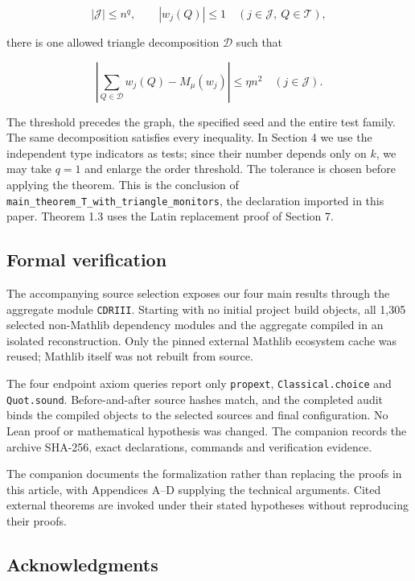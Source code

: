 \documentclass[english,11pt,a4paper]{article}
\begin{document}
\[|\mathcal J|\leq n^q,\qquad |w_j(Q)|\leq1\quad(j\in\mathcal J,\ Q\in\mathcal T),\]

there is one allowed triangle decomposition \(\mathcal D\) such that

\[\left|\sum_{Q\in\mathcal D}w_j(Q)-M_\mu(w_j)\right|\leq\eta n^2
\quad(j\in\mathcal J).\]

The threshold precedes the graph, the specified seed and the entire test family. The same decomposition satisfies every inequality. In Section 4 we use the independent type indicators as tests; since their number depends only on \(k\), we may take \(q=1\) and enlarge the order threshold. The tolerance is chosen before applying the theorem. This is the conclusion of \texttt{main\_\allowbreak{}theorem\_\allowbreak{}T\_\allowbreak{}with\_\allowbreak{}triangle\_\allowbreak{}monitors}, the declaration imported in this paper. Theorem 1.3 uses the Latin replacement proof of Section 7.

\subsection{Formal verification}\label{formal-verification}

The accompanying source selection exposes our four main results through the aggregate module \texttt{CDRIII}. Starting with no initial project build objects, all 1,305 selected non-Mathlib dependency modules and the aggregate compiled in an isolated reconstruction. Only the pinned external Mathlib ecosystem cache was reused; Mathlib itself was not rebuilt from source.

The four endpoint axiom queries report only \texttt{propext}, \texttt{Classical.\allowbreak{}choice} and \texttt{Quot.\allowbreak{}sound}. Before-and-after source hashes match, and the completed audit binds the compiled objects to the selected sources and final configuration. No Lean proof or mathematical hypothesis was changed. The companion records the archive SHA-256, exact declarations, commands and verification evidence.

The companion documents the formalization rather than replacing the proofs in this article, with Appendices A--D supplying the technical arguments. Cited external theorems are invoked under their stated hypotheses without reproducing their proofs.

\subsection{Acknowledgments}\label{acknowledgments}
\end{document}
